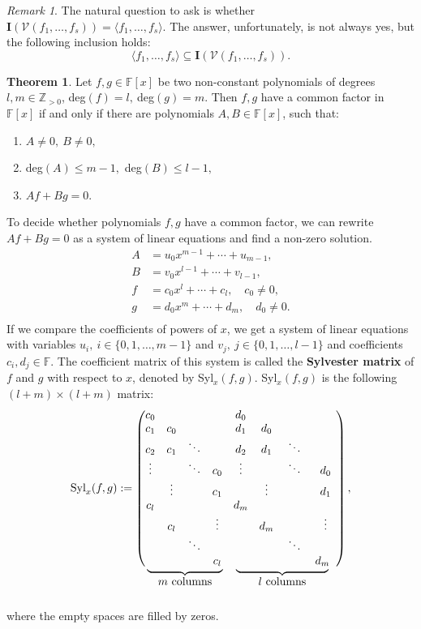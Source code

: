 \documentclass[thesis=M,english]{FITthesis}[2012/10/20]
\theoremstyle{remark}
\newtheorem*{RM}{Remark}
\theoremstyle{definition}
\newtheorem{theorem}{Theorem}[section]
\newcommand\coolunder[2]{\mathrlap{\smash{\underbrace{\phantom{%
    \begin{matrix} #2 \end{matrix}}}_{\mbox{$#1$}}}}#2}
\begin{document}
\begin{RM}
The natural question to ask is whether $\mathbf{I}(\mathcal{V}(f_1,\ldots,f_s)) = \langle f_1,\ldots,f_s \rangle.$ The answer, unfortunately, is not always yes, but the following inclusion holds:
$$
\langle f_1,\ldots,f_s \rangle \subseteq \mathbf{I}(\mathcal{V}(f_1,\ldots,f_s)) .
$$
\end{RM} 
\begin{theorem}
Let $f,g \in \mathbb{F}[x]$ be two non-constant polynomials of degrees $l,m \in \mathbb{Z}_{>0}$, deg$(f) = l,\ $deg$(g)=m$. Then $f,g$ have a common factor in $\mathbb{F}[x]$ if and only if there are polynomials $A,B \in \mathbb{F}[x]$, such that:
\begin{enumerate}
\item $A \neq 0,\ B \neq 0,$ 
\item deg$(A) \leq m - 1,$ deg$(B) \leq l - 1,$
\item $Af  + Bg = 0.$
\end{enumerate}
\noindent To decide whether polynomials $f,g$ have a common factor, we can rewrite $Af  + Bg = 0$ as a system of linear equations and find a non-zero solution.
\begin{align*}
A &= u_0x^{m-1} + \cdots + u_{m-1}, \\
B &= v_0x^{l-1} + \cdots + v_{l-1}, \\
f &= c_0x^l + \cdots + c_l, \quad c_0 \neq 0, \\
g &= d_0x^m + \cdots + d_m, \quad d_0 \neq 0. \\
\end{align*}
If we compare the coefficients of powers of $x$, we get a system of linear equations with variables $u_i,\ i \in \{0,1,\ldots	, m - 1\}$ and $v_j,\ j \in \{0,1,\ldots, l - 1\}$ and coefficients $c_i, d_j \in \mathbb{F}.$ The coefficient matrix of this system is called the \textbf{Sylvester matrix} of $f$ and $g$ with respect to $x$, denoted by Syl$_{x}(f,g)$. Syl$_{x}(f,g)$ is the following $(l + m) \times (l + m)$ matrix:
$$
\text{Syl}_{x}(f,g) := \begin{pmatrix}
c_0 &  &  &  &             d_0 &  &  &  \\
c_1 & c_0 &  &  &        d_1 & d_0 &   &  \\
c_2 & c_1 & \ddots &  & d_2 & d_1 & \ddots  &  \\
\vdots & & \ddots & c_0 & \vdots &  & \ddots & d_0 \\
 &  \vdots &  & c_1 &  & \vdots &  & d_1 \\
c_l &  &  &  &  d_m&  &  & \\
 & c_l &  & \vdots &  & d_m &  & \vdots \\
 &  & \ddots &  &  &  & \ddots &  \\
\coolunder{m \text{ columns}}{\hphantom{..} & \hphantom{...} & \hphantom{..}  & c_l & }\coolunder{l \text{ columns}}{\hphantom{...} & \hphantom{...} & \hphantom{......} & d_m \hphantom{..}} \\
\end{pmatrix},
$$ \\  \\
\noindent where the empty spaces are filled by zeros.
\end{theorem}
\end{document}
